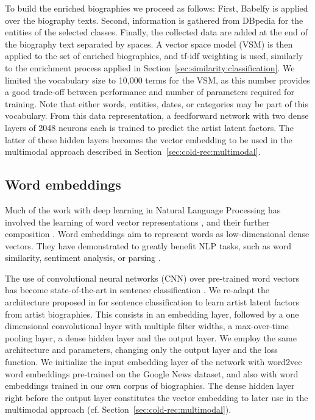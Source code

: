 To build the enriched biographies we proceed as follows: First, Babelfy is applied over the biography texts. Second, information is gathered from DBpedia for the entities of the selected classes. Finally, the collected data are added at the end of the biography text separated by spaces. A vector space model (VSM) is then applied to the set of enriched biographies, and tf-idf weighting \citep{Zobel1998} is used, similarly to the enrichment process applied in Section~\ref{sec:similarity:classification}. We limited the vocabulary size to 10,000 terms for the VSM, as this number provides a good trade-off between performance and number of parameters required for training. Note that either words, entities, dates, or categories may be part of this vocabulary. From this data representation, a feedforward network with two dense layers of 2048 neurons each is trained to predict the artist latent factors. The latter of these hidden layers becomes the vector embedding to be used in the multimodal approach described in Section~\ref{sec:cold-rec:multimodal}.

\subsection{Word embeddings}\label{sec:cold-rec:w2v}

Much of the work with deep learning in Natural Language Processing has involved the learning of word vector representations \citep{Bengio2003,Mikolov2013}, and their further composition \citep{Collobert2011}. Word embeddings aim to represent words as low-dimensional dense vectors. They have demonstrated to greatly benefit NLP tasks, such as word similarity, sentiment analysis, or parsing \citep{Nguyen2016}. 

The use of convolutional neural networks (CNN) over pre-trained word vectors has become state-of-the-art in sentence classification \citep{Kim2014}. 
We re-adapt the architecture proposed in \cite{Kim2014} for sentence classification to learn artist latent factors from artist biographies. This consists in an embedding layer, followed by a one dimensional convolutional layer with multiple filter widths, a max-over-time pooling layer, a dense hidden layer and the output layer. We employ the same architecture and parameters, changing only the output layer and the loss function. We initialize the input embedding layer of the network with word2vec word embeddings pre-trained on the Google News dataset, and also with word embeddings trained in our own corpus of biographies. The dense hidden layer right before the output layer constitutes the vector embedding to later use in the multimodal approach (cf. Section~\ref{sec:cold-rec:multimodal}).

